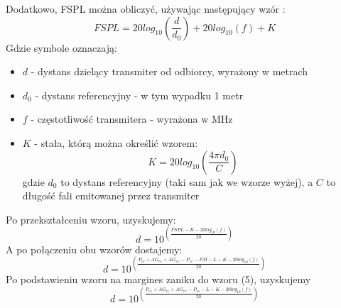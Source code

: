Dodatkowo, FSPL można obliczyć, używając następujący wzór \cite{EN}:
\begin{equation}
FSPL = 20log_{10}\left(\frac{d}{d_{0}}\right) + 20log_{10}(f) + K
\end{equation}
Gdzie symbole oznaczają:
\begin{itemize}
	\item $d$ - dystans dzielący transmiter od odbiorcy, wyrażony w metrach
	\item $d_{0}$ - dystans referencyjny -  w tym wypadku 1 metr
	\item $f$ - częstotliwość transmitera - wyrażona w MHz
	\item $K$ - stała, którą można określić wzorem:
	\begin{equation}
	K = 20log_{10}\left(\frac{4\pi d_{0}}{C}\right)
	\end{equation}
	gdzie $d_{0}$ to dystans referencyjny (taki sam jak we wzorze wyżej), a $C$ to długość fali emitowanej przez transmiter
\end{itemize}	  
Po przekształceniu wzoru, uzyskujemy:
\begin{equation}
d = 10^{\left(\frac{FSPL - K - 20log_{10}(f)}{20}\right)}
\end{equation}
A po połączeniu obu wzorów dostajemy:
\begin{equation}
d = 10^{\left(\frac{P_{tx} + AG_{tx} + AG_{rx} - P_{rx} - FM - L - K - 20log_{10}(f)}{20}\right)}
\end{equation}
Po podstawieniu wzoru na margines zaniku do wzoru (5), uzyskujemy
\begin{equation}
d = 10^{\left(\frac{P_{tx} + AG_{tx} + AG_{rx} - P_{rs} - L - K - 20log_{10}(f)}{20}\right)}
\end{equation}